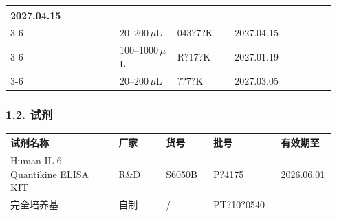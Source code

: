 \documentclass[UTF8,10pt,a4paper,fontset=fandol]{ctexart}
\newcommand{\fieldvalue}[1]{#1}
\newcommand{\handwritten}[1]{#1}
\begin{document}
\begin{tabular}{|p{0.16\linewidth}|p{0.14\linewidth}|p{0.17\linewidth}|p{0.17\linewidth}|p{0.18\linewidth}|p{0.12\linewidth}|}
\fieldvalue{\handwritten{2027.04.15}} & \\
\cline{3-6}
& &
\fieldvalue{\handwritten{20--200\,\(\mu\)L}} &
\fieldvalue{\handwritten{043?7?K}} &
\fieldvalue{\handwritten{2027.04.15}} & \\
\cline{3-6}
& &
\fieldvalue{\handwritten{100--1000\,\(\mu\)L}} &
\fieldvalue{\handwritten{R?17?K}} &
\fieldvalue{\handwritten{2027.01.19}} & \\
\cline{3-6}
& &
\fieldvalue{\handwritten{20--200\,\(\mu\)L}} &
\fieldvalue{\handwritten{??7?K}} &
\fieldvalue{\handwritten{2027.03.05}} & \\
\hline
\end{tabular}

\subsubsection{1.2. 试剂}

\begin{tabular}{|p{0.32\linewidth}|p{0.14\linewidth}|p{0.14\linewidth}|p{0.20\linewidth}|p{0.14\linewidth}|}
\hline
试剂名称 & 厂家 & 货号 & 批号 & 有效期至 \\
\hline
Human IL-6 Quantikine ELISA KIT & R\&D & S6050B &
\fieldvalue{\handwritten{P?4175}} &
\fieldvalue{\handwritten{2026.06.01}} \\
\hline
完全培养基 & 自制 & / &
\fieldvalue{\handwritten{PT?10?0540}} &
\fieldvalue{\handwritten{—}} \\
\hline
\end{tabular}
\end{document}
